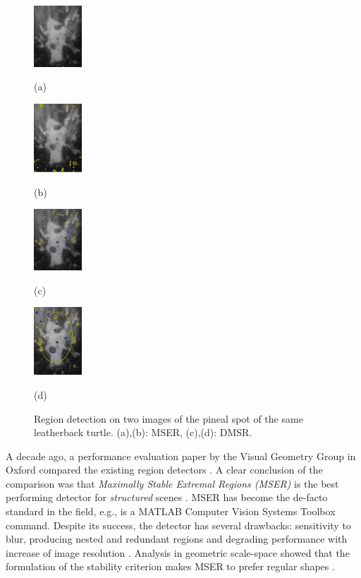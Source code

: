 \documentclass{article}
\begin{document}
\begin{figure}[htb]

\begin{minipage}[b]{.24\linewidth}
  \centering
  \centerline{\includegraphics[width=1.8cm]{./Figs/mserLeatherbackA}}
   \centerline{(a)}\medskip
\end{minipage}
\hfill
\begin{minipage}[b]{0.24\linewidth}
  \centering
  \centerline{\includegraphics[width=1.8cm]{./Figs/mserLeatherbackB}}
\centerline{(b)}\medskip
\end{minipage}
\hfill
\begin{minipage}[b]{.24\linewidth}
  \centering
  \centerline{\includegraphics[width=1.8cm]{./Figs/dmsrLeatherbackA}}
\centerline{(c)}\medskip
\end{minipage}
\hfill
\begin{minipage}[b]{0.24\linewidth}
  \centering
  \centerline{\includegraphics[width=1.8cm]{./Figs/dmsrLeatherbackB}}
 \centerline{(d)}\medskip
\end{minipage}
 \vspace{-0.4cm} 
\caption{Region detection on two images of the pineal spot of the same leatherback turtle.
(a),(b): MSER, (c),(d): DMSR.}
\label{fig:turtle}
 \vspace{-0.4cm}
\end{figure}

A decade ago, a performance evaluation paper by the Visual Geometry Group in Oxford compared the existing region detectors \cite{Mikolajczyk:2005}. 
A clear conclusion of the comparison was that {\em  Maximally Stable Extremal Regions (MSER)} is the best performing detector for {\em structured} scenes \cite{Matas2002BMVC}. MSER has become the de-facto standard in the field, e.g., is a MATLAB Computer Vision Systems Toolbox command. Despite its success, the detector has several drawbacks: sensitivity to blur, producing nested and redundant regions and degrading performance with increase of image resolution \cite{CorRos2013}. Analysis in geometric scale-space showed that the formulation of the stability criterion makes MSER to prefer regular shapes \cite{Kimmel11}.
\end{document}
